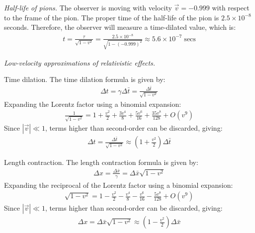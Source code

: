 \documentclass{report}
\begin{document}
\begin{subquests}
	\item \emph{Half-life of pions.}
	The observer is moving with velocity ${\vec v} = -0.999$ with respect to the frame of the pion. The proper time of the half-life of the pion is $2.5 \times 10^{-8}$ seconds. Therefore, the observer will measure a time-dilated value, which is:
	\begin{gather*}
		t = \frac{\tau}{\sqrt{1-v^2}} = \frac{2.5 \times 10^{-8}}{\sqrt{1-(-0.999)^2}}\approx 5.6 \times 10^{-7}\; \mathrm{secs}
	\end{gather*}

	\item \emph{Low-velocity approximations of relativistic effects.}
	\begin{subquests}
		\item Time dilation.
		The time dilation formula is given by:
		\begin{gather*}
			\Delta{t} = \gamma \Delta{\bar{t}} = \frac{\Delta{\bar{t}}}{\sqrt{1-v^2}}
		\end{gather*}
		Expanding the Lorentz factor using a binomial expansion:
		\begin{gather*}
			\frac{1}{\sqrt{1-v^2}} = 1+\frac{v^2}{2}+\frac{3v^4}{8}+\frac{5v^6}{16}+\frac{35v^8}{128}+O(v^9)
		\end{gather*}
		Since $ |{\vec v}| \ll 1$, terms higher than second-order can be discarded, giving:
		\begin{gather*}
			\Delta{t} = \frac{\Delta{\bar{t}}}{\sqrt{1-v^2}}\approx \left(1+\frac{v^2}{2}\right)\Delta{\bar{t}}
		\end{gather*}
		
		\item Length contraction.
		The length contraction formula is given by:
		\begin{gather*}
			\Delta{x} = \frac{\Delta{\bar{x}}}{\gamma} = \Delta{\bar{x}}{\sqrt{1-v^2}}
		\end{gather*}
		Expanding the reciprocal of the Lorentz factor using a binomial expansion:
		\begin{gather*}
			\sqrt{1-v^2} = 1-\frac{v^2}{2}-\frac{v^4}{8}-\frac{v^6}{16}-\frac{5v^8}{128}+O(v^9)
		\end{gather*}
		Since $|{\vec v}| \ll 1$, terms higher than second-order can be discarded, giving:
		\begin{gather*}
			\Delta{x} = \Delta{\bar{x}}{\sqrt{1-v^2}} \approx \left(1-\frac{v^2}{2}\right)\Delta{\bar{x}}
		\end{gather*}
		

\end{subquests}
\end{subquests}
\end{document}
